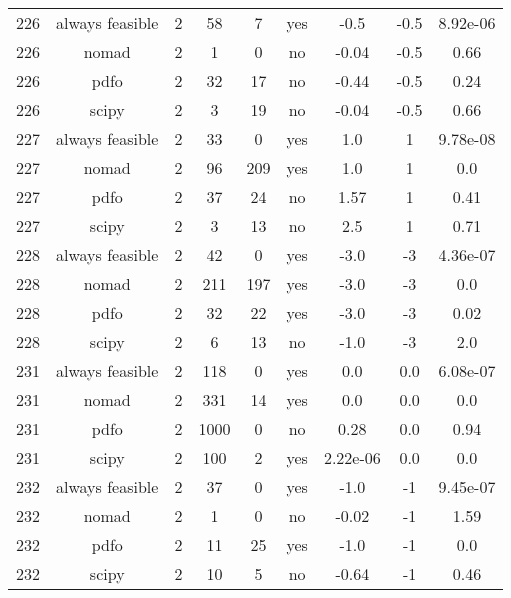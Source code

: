 \begin{scriptsize}
\begin{center}
\begin{longtable}{ccccccccc}
226 & always feasible &  2 &     58 &      7 &     yes &        -0.5 &        -0.5 & 8.92e-06\\
226 &           nomad &  2 &      1 &      0 &      no &       -0.04 &        -0.5 &     0.66\\
226 &            pdfo &  2 &     32 &     17 &      no &       -0.44 &        -0.5 &     0.24\\
226 &           scipy &  2 &      3 &     19 &      no &       -0.04 &        -0.5 &     0.66\\
227 & always feasible &  2 &     33 &      0 &     yes &         1.0 &           1 & 9.78e-08\\
227 &           nomad &  2 &     96 &    209 &     yes &         1.0 &           1 &      0.0\\
227 &            pdfo &  2 &     37 &     24 &      no &        1.57 &           1 &     0.41\\
227 &           scipy &  2 &      3 &     13 &      no &         2.5 &           1 &     0.71\\
228 & always feasible &  2 &     42 &      0 &     yes &        -3.0 &          -3 & 4.36e-07\\
228 &           nomad &  2 &    211 &    197 &     yes &        -3.0 &          -3 &      0.0\\
228 &            pdfo &  2 &     32 &     22 &     yes &        -3.0 &          -3 &     0.02\\
228 &           scipy &  2 &      6 &     13 &      no &        -1.0 &          -3 &      2.0\\
231 & always feasible &  2 &    118 &      0 &     yes &         0.0 &         0.0 & 6.08e-07\\
231 &           nomad &  2 &    331 &     14 &     yes &         0.0 &         0.0 &      0.0\\
231 &            pdfo &  2 &   1000 &      0 &      no &        0.28 &         0.0 &     0.94\\
231 &           scipy &  2 &    100 &      2 &     yes &    2.22e-06 &         0.0 &      0.0\\
232 & always feasible &  2 &     37 &      0 &     yes &        -1.0 &          -1 & 9.45e-07\\
232 &           nomad &  2 &      1 &      0 &      no &       -0.02 &          -1 &     1.59\\
232 &            pdfo &  2 &     11 &     25 &     yes &        -1.0 &          -1 &      0.0\\
232 &           scipy &  2 &     10 &      5 &      no &       -0.64 &          -1 &     0.46\\

\end{longtable}
\end{center}
\end{scriptsize}
